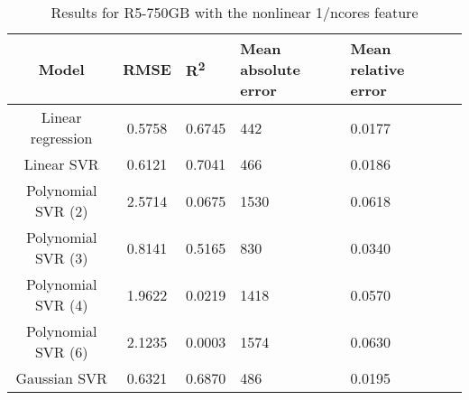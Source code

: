 \begin{table}[H]
\centering
\begin{adjustbox}{center}
\begin{tabular}{c | c M{1.2cm} M{2.5cm} M{2.5cm} M{1.8cm}}
Model & RMSE & R\textsuperscript{2} & Mean absolute error & Mean relative error \tabularnewline
\hline
Linear regression & 0.5758 & 0.6745 &    442 & 0.0177 \\
Linear SVR & 0.6121 & 0.7041 &    466 & 0.0186 \\
Polynomial SVR (2) & 2.5714 & 0.0675 &   1530 & 0.0618 \\
Polynomial SVR (3) & 0.8141 & 0.5165 &    830 & 0.0340 \\
Polynomial SVR (4) & 1.9622 & 0.0219 &   1418 & 0.0570 \\
Polynomial SVR (6) & 2.1235 & 0.0003 &   1574 & 0.0630 \\
Gaussian SVR & 0.6321 & 0.6870 &    486 & 0.0195 \\
\end{tabular}
\end{adjustbox}
\\
\caption{Results for R5-750GB with the nonlinear 1/ncores feature}
\label{tab:all_nonlinear_R5_750}
\end{table}
